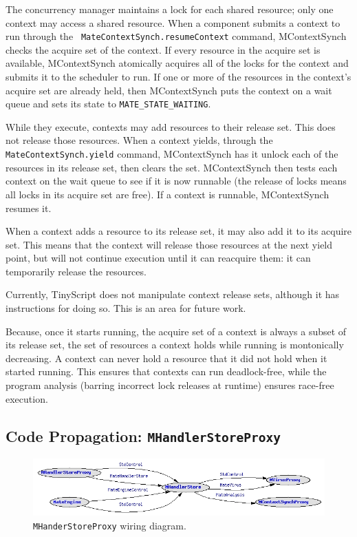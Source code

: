 \documentclass[12pt]{article}
\begin{document}
The concurrency manager maintains a lock for each shared resource;
only one context may access a shared resource. When a component
submits a context to run through the {\tt
MateContextSynch.resumeContext} command, MContextSynch checks the
acquire set of the context. If every resource in the acquire set is
available, MContextSynch atomically acquires all of the locks for the
context and submits it to the scheduler to run. If one or more of the
resources in the context's acquire set are already held, then
MContextSynch puts the context on a wait queue and sets its state to
{\tt MATE\_STATE\_WAITING}.

While they execute, contexts may add resources to their release
set. This does not release those resources. When a context yields,
through the {\tt MateContextSynch.yield} command, MContextSynch has it
unlock each of the resources in its release set, then clears the
set. MContextSynch then tests each context on the wait queue to see if
it is now runnable (the release of locks means all locks in its
acquire set are free). If a context is runnable, MContextSynch resumes
it.

When a context adds a resource to its release set, it may also add it
to its acquire set. This means that the context will release those
resources at the next yield point, but will not continue execution
until it can reacquire them: it can temporarily release the resources.

Currently, TinyScript does not manipulate context release sets,
although it has instructions for doing so. This is an area for future
work.

Because, once it starts running, the acquire set of a context is
always a subset of its release set, the set of resources a context
holds while running is montonically decreasing. A context can never
hold a resource that it did not hold when it started running. This
ensures that contexts can run deadlock-free, while the program
analysis (barring incorrect lock releases at runtime) ensures
race-free execution.


\subsection{Code Propagation: {\tt MHandlerStoreProxy}}


\begin{figure}
\centering
\includegraphics[width=6in]{fig/MHandlerStoreProxy.jpg}
\caption{{\tt MHanderStoreProxy} wiring diagram.}
\label{fig:handler-store}
\end{figure}
\end{document}
